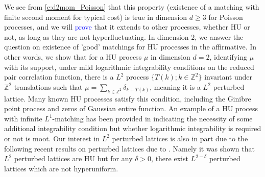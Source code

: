 \documentclass[12pt]{article}
\newcommand{\1}{\mathbf{1}}
\newcommand{\dy}[1]{\textcolor{blue}{#1}}
\newcommand{\dy}[1]{#1}%
\begin{document}
We see from  \eqref{e:d2mom_Poisson} that this property ({existence of a matching with finite second moment for typical cost}) is true in dimension $ d\geqslant 3$ for Poisson processes, and we will \dy{prove} that it extends to other processes, whether HU or not, as long as they are not hyperfluctuating. In dimension $ 2$, {we answer the question {on existence of 'good' matchings for HU processes in the affirmative}}. In other words,   {we show that for a  HU process $\mu$ in dimension $ d = 2$}, {identifying $ \mu $ with its support,} under mild logarithmic integrability conditions on the reduced pair correlation function, there is a $L^{2}$ process $ \{T(k);k\in \mathbb{Z} ^{2}\}$  {invariant under $ \mathbb{Z} ^{2}$ translations} such that {$\mu  = \sum_{k\in \mathbb{Z} ^{2}} \delta_{k + T(k)}$}, meaning it is a $L^{2}$ perturbed lattice. {Many known HU processes satisfy this condition, including the Ginibre point process and zeros of Gaussian entire function.} {An example of a HU process with infinite $L^1$-matching has been provided in \cite[Theorem 2(2)]{huesmann2024link} indicating the necessity of some additional integrability condition but whether logarithmic integrability is required or not is moot.  }
Our interest in $L^2$ perturbed lattices is also in part due to the following recent results on perturbed lattices due to \cite{DFHL}. Namely it was shown that $L^{2}$ perturbed lattices are HU but  for any $ \delta > 0$, there exist $L^{2-\delta}$ perturbed lattices which are not hyperuniform.
\end{document}
